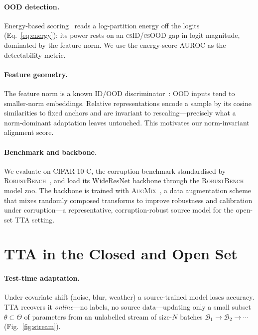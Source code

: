 \documentclass[11pt]{article}
\newcommand{\csid}{\textsc{cs}ID}
\newcommand{\csood}{\textsc{cs}OOD}
\newcommand{\method}[1]{\textsc{#1}}
\begin{document}
\paragraph{OOD detection.} Energy-based scoring~\cite{energy} reads a
log-partition energy off the logits (Eq.~\eqref{eq:energy}); its power
rests on an \csid/\csood{} gap in logit magnitude, dominated by the
feature norm. We use the energy-score AUROC as the detectability metric.

\paragraph{Feature geometry.} The feature norm is a known ID/OOD
discriminator~\cite{featurenorm}: OOD inputs tend to smaller-norm
embeddings. Relative representations encode a sample by its
cosine similarities to fixed anchors and are invariant to
rescaling---precisely what a norm-dominant adaptation leaves untouched.
This motivates our norm-invariant alignment score.

\paragraph{Benchmark and backbone.} We evaluate on CIFAR-10-C, the
corruption benchmark standardised by \method{RobustBench}~\cite{robustbench},
and load its WideResNet backbone through the \method{RobustBench} model
zoo. The backbone is trained with \method{AugMix}~\cite{augmix}, a data
augmentation scheme that mixes randomly composed transforms to improve
robustness and calibration under corruption---a representative,
corruption-robust source model for the open-set TTA setting.

\newpage
\section{TTA in the Closed and Open Set}\label{sec:tta}

\paragraph{Test-time adaptation.} Under covariate shift (noise, blur,
weather) a source-trained model loses accuracy. TTA recovers it
\emph{online}---no labels, no source data---updating only a small subset
$\theta\subset\Theta$ of parameters from an unlabelled stream of
size-$N$ batches $\mathcal{B}_1\!\to\!\mathcal{B}_2\!\to\!\cdots$
(Fig.~\ref{fig:stream}).
\end{document}
